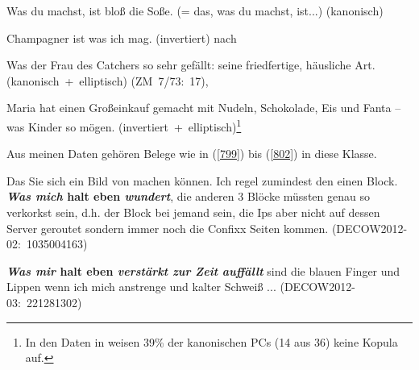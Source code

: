 \begin{exe}
	\ex\label{795} 
	Was du machst, ist bloß die Soße. (= das, was du machst, ist...) (kanonisch)
	\newline
	\hbox{}\hfill\hbox{\citet[360]{Lehmann1984}}	
\end{exe}
\vspace{-0.65cm}
\begin{exe}
	\ex\label{796} 
	Champagner ist was ich mag. (invertiert)
	\hfill\hbox{nach \citet[467]{Lambrecht2001}}	
\end{exe}
\vspace{-0.65cm}
\begin{exe}
	\ex\label{797} 
	Was der Frau des Catchers so sehr gefällt: seine friedfertige, häusliche Art. 
	\hfill\hbox{(kanonisch + elliptisch)}
	\newline
	\hbox{}\hfill\hbox{(ZM 7/73: 17), \citet[74-75]{Dyhr1978}}		
\end{exe}
\vspace{-0.65cm}
\begin{exe}
	\ex\label{798} 
	Maria hat einen Großeinkauf gemacht mit Nudeln, Schokolade, Eis und Fanta – was Kinder so mögen.
	\hfill\hbox{(invertiert + elliptisch)}\footnote{In den Daten in \citet[84]{Guenthner2006} weisen 39\% der kanonischen PCs (14 aus 36) keine Kopula auf.}	
\end{exe}			         	                 
Aus meinen Daten gehören Belege wie in (\ref{799}) bis (\ref{802}) in diese Klasse. 

\begin{exe}
	\ex\label{799} 
	\scriptsize
	Das Sie sich ein Bild von machen können. Ich regel zumindest den einen Block. \textbf{\textit{Was mich} halt eben 				\textit{wundert}}, die anderen 3 Blöcke müssten genau so verkorkst sein, d.h. der Block bei jemand sein, die Ips aber nicht 	auf dessen Server geroutet sondern immer noch die Confixx Seiten kommen.                                                                                             
	\newline
	\hbox{}\hfill\hbox{(DECOW2012-02: 1035004163)}
\end{exe}

\begin{exe}
	\ex\label{800} 
	\scriptsize
	\textbf{\textit{Was mir} halt eben \textit{verstärkt zur Zeit auffällt}} sind die blauen Finger und Lippen wenn ich mich 		anstrenge und kalter Schweiß ...	
	\hfill\hbox{(DECOW2012-03: 221281302)}
\end{exe}					    	


